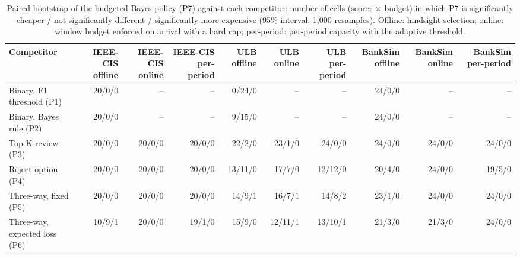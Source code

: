 \begin{table}[t]
\centering
\caption{Paired bootstrap of the budgeted Bayes policy (P7) against each competitor: number of cells (scorer $\times$ budget) in which P7 is significantly cheaper / not significantly different / significantly more expensive (95\% interval, 1,000 resamples). Offline: hindsight selection; online: window budget enforced on arrival with a hard cap; per-period: per-period capacity with the adaptive threshold.}
\label{tab:boot}
\begin{tabular}{lrrrrrrrrr}
\toprule
Competitor & IEEE-CIS offline & IEEE-CIS online & IEEE-CIS per-period & ULB offline & ULB online & ULB per-period & BankSim offline & BankSim online & BankSim per-period \\
\midrule
Binary, F1 threshold (P1) & 20/0/0 & -- & -- & 0/24/0 & -- & -- & 24/0/0 & -- & -- \\
Binary, Bayes rule (P2) & 20/0/0 & -- & -- & 9/15/0 & -- & -- & 24/0/0 & -- & -- \\
Top-K review (P3) & 20/0/0 & 20/0/0 & 20/0/0 & 22/2/0 & 23/1/0 & 24/0/0 & 24/0/0 & 24/0/0 & 24/0/0 \\
Reject option (P4) & 20/0/0 & 20/0/0 & 20/0/0 & 13/11/0 & 17/7/0 & 12/12/0 & 20/4/0 & 24/0/0 & 19/5/0 \\
Three-way, fixed (P5) & 20/0/0 & 20/0/0 & 20/0/0 & 14/9/1 & 16/7/1 & 14/8/2 & 23/1/0 & 24/0/0 & 24/0/0 \\
Three-way, expected loss (P6) & 10/9/1 & 20/0/0 & 19/1/0 & 15/9/0 & 12/11/1 & 13/10/1 & 21/3/0 & 21/3/0 & 24/0/0 \\
\bottomrule
\end{tabular}
\end{table}
